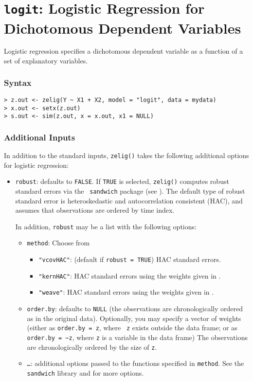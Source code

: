 \section{{\tt logit}: Logistic Regression for Dichotomous Dependent
Variables}\label{logit}

Logistic regression specifies a dichotomous dependent variable as a
function of a set of explanatory variables.
\subsubsection{Syntax}

\begin{verbatim}
> z.out <- zelig(Y ~ X1 + X2, model = "logit", data = mydata)
> x.out <- setx(z.out)
> s.out <- sim(z.out, x = x.out, x1 = NULL)
\end{verbatim}

\subsubsection{Additional Inputs} 

In addition to the standard inputs, {\tt zelig()} takes the following
additional options for logistic regression:  
\begin{itemize}
\item {\tt robust}: defaults to {\tt FALSE}.  If {\tt TRUE} is
selected, {\tt zelig()} computes robust standard errors via the {\tt
sandwich} package (see \cite{Zeileis04}).  The default type of robust
standard error is heteroskedastic and autocorrelation consistent (HAC),
and assumes that observations are ordered by time index.

In addition, {\tt robust} may be a list with the following options:  
\begin{itemize}
\item {\tt method}:  Choose from 
\begin{itemize}
\item {\tt "vcovHAC"}: (default if {\tt robust = TRUE}) HAC standard
errors. 
\item {\tt "kernHAC"}: HAC standard errors using the
weights given in \cite{Andrews91}. 
\item {\tt "weave"}: HAC standard errors using the
weights given in \cite{LumHea99}.  
\end{itemize}  
\item {\tt order.by}: defaults to {\tt NULL} (the observations are
chronologically ordered as in the original data).  Optionally, you may
specify a vector of weights (either as {\tt order.by = z}, where {\tt
z} exists outside the data frame; or as {\tt order.by = \~{}z}, where
{\tt z} is a variable in the data frame)  The observations are
chronologically ordered by the size of {\tt z}.
\item {\tt \dots}:  additional options passed to the functions 
specified in {\tt method}.   See the {\tt sandwich} library and
\cite{Zeileis04} for more options.   
\end{itemize}
\end{itemize}

